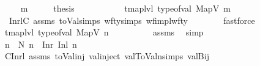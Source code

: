 \begin{isabellebody}
\isamarkupfalse%
\isanewline
\ \ \isamarkupfalse%
\ {\isacharparenleft}{\kern0pt}{}\ m{\isacharprime}{\kern0pt}{\isacharparenright}{\kern0pt}\isanewline
\ \ \isamarkupfalse%
\ \isamarkupfalse%
\ {\isacharquery}{\kern0pt}thesis\ \isanewline
\ \ \isamarkupfalse%
\ {\isacharminus}{\kern0pt}\isanewline
\ \ \ \ \isamarkupfalse%
\ {\isachardoublequoteopen}tmap{\isacharunderscore}{\kern0pt}lvl\ {\isacharparenleft}{\kern0pt}type{\isacharunderscore}{\kern0pt}of{\isacharunderscore}{\kern0pt}val\ {\isacharparenleft}{\kern0pt}MapV\ m{\isacharparenright}{\kern0pt}{\isacharparenright}{\kern0pt}\ {\isacharequal}{\kern0pt}\ {}{\isachardoublequoteclose}\isanewline
\ \ \ \ \ \ \isamarkupfalse%
\ {\isachardoublequoteopen}{}{\isachardoublequoteclose}\ InrlC{}\ assms{\isacharparenleft}{\kern0pt}{}{\isacharparenright}{\kern0pt}\ toVal{}{}{}{}{\isachardot}{\kern0pt}simps{\isacharparenleft}{\kern0pt}{}{\isacharparenright}{\kern0pt}\ wf{\isacharunderscore}{\kern0pt}ty{\isachardot}{\kern0pt}simps{\isacharparenleft}{\kern0pt}{}{\isacharparenright}{\kern0pt}\ wf{\isacharunderscore}{\kern0pt}impl{\isacharunderscore}{\kern0pt}wf{\isacharunderscore}{\kern0pt}ty\isanewline
\ \ \ \ \ \ \isamarkupfalse%
\ fastforce\isanewline
\ \ \ \ \isamarkupfalse%
\ \isamarkupfalse%
\ {\isachardoublequoteopen}tmap{\isacharunderscore}{\kern0pt}lvl\ {\isacharparenleft}{\kern0pt}type{\isacharunderscore}{\kern0pt}of{\isacharunderscore}{\kern0pt}val\ {\isacharparenleft}{\kern0pt}MapV\ n{\isacharparenright}{\kern0pt}{\isacharparenright}{\kern0pt}\ {\isacharequal}{\kern0pt}\ {}{\isachardoublequoteclose}\isanewline
\ \ \ \ \ \ \isamarkupfalse%
\ assms{\isacharparenleft}{\kern0pt}{}{\isacharparenright}{\kern0pt}\ \isamarkupfalse%
\ simp\isanewline
\ \ \ \ \isamarkupfalse%
\ \isamarkupfalse%
\ n{\isacharprime}{\kern0pt}\ \ N{\isacharcolon}{\kern0pt}\ {\isachardoublequoteopen}n\ {\isacharequal}{\kern0pt}\ Inr\ {\isacharparenleft}{\kern0pt}Inl\ n{\isacharprime}{\kern0pt}{\isacharparenright}{\kern0pt}{\isachardoublequoteclose}\isanewline
\ \ \ \ \ \ \isamarkupfalse%
\ C{}Inrl\ assms{\isacharparenleft}{\kern0pt}{}{\isacharparenright}{\kern0pt}\ toVal{}{}{}{}{\isacharunderscore}{\kern0pt}inj\ val{\isachardot}{\kern0pt}inject{\isacharparenleft}{\kern0pt}{}{\isacharparenright}{\kern0pt}\ val{}ToValn{\isachardot}{\kern0pt}simps{\isacharparenleft}{\kern0pt}{}{\isacharparenright}{\kern0pt}\ valBij\isanewline

\end{isabellebody}
